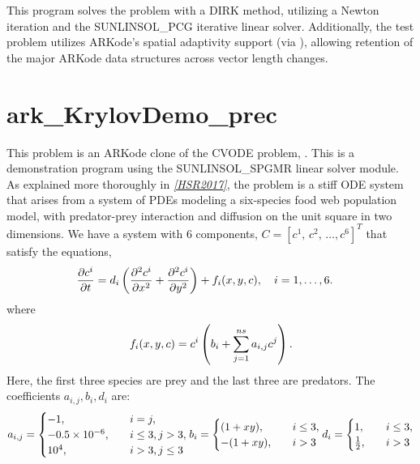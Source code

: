 \documentclass[letterpaper,10pt,english]{sphinxmanual}
\begin{document}
This program solves the problem with a DIRK method, utilizing a Newton
iteration and the SUNLINSOL\_PCG iterative linear solver.
Additionally, the test problem utilizes ARKode's spatial adaptivity
support (via ), allowing retention of the
major ARKode data structures across vector length changes.


\section{ark\_KrylovDemo\_prec}
\label{c_serial:ark-krylovdemo-prec}\label{c_serial:id28}
This problem is an ARKode clone of the CVODE problem,
.  This is a demonstration program using the
SUNLINSOL\_SPGMR linear solver module.  As explained more thoroughly in
\label{c_serial:id29}{\hyperref[References:hsr2017]{\emph{{[}HSR2017{]}}}}, the problem is a stiff ODE system that arises from a
system of PDEs modeling a six-species food web population model, with
predator-prey interaction and diffusion on the unit square in two
dimensions.  We have a system with 6 components, \(C = [c^1,\,
c^2,\,\ldots, c^6]^T\) that satisfy the equations,
\begin{gather}
\begin{split}\frac{\partial c^i}{\partial t} &= d_i \left(\frac{\partial^2 c^i}{\partial
   x^2} + \frac{\partial^2 c^i}{\partial y^2}\right) +
   f_i(x,y,c),\quad i=1,\ldots,6.\end{split}\notag
\end{gather}
where
\begin{gather}
\begin{split}f_i(x,y,c) = c^i\left( b_i + \sum_{j=1}^{ns} a_{i,j} c^j\right).\end{split}\notag
\end{gather}
Here, the first three species are prey and the last three are
predators.  The coefficients \(a_{i,j}, b_i, d_i\) are:
\begin{gather}
\begin{split}a_{i,j} = \begin{cases}
            -1, \quad & i=j,\\
            -0.5\times10^{-6}, \quad & i\le 3, j>3, \\
             10^4, \quad & i>3, j\le3
          \end{cases}
b_i = \begin{cases}
         (1+xy), \quad & i\le 3,\\
        -(1+xy), \quad & i>3
      \end{cases}
d_i = \begin{cases}
         1, \quad & i\le 3,\\
         \frac12, \quad & i>3
      \end{cases}\end{split}\notag
\end{gather}
\end{document}
